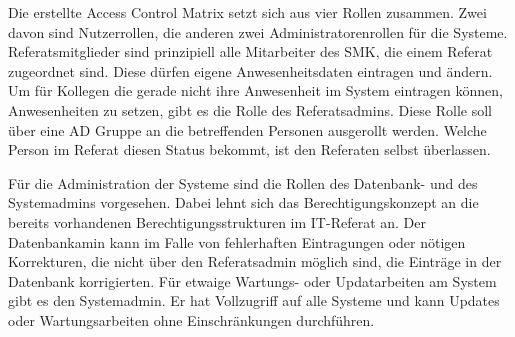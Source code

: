 Die erstellte Access Control Matrix setzt sich aus vier Rollen zusammen. Zwei davon sind Nutzerrollen, die anderen zwei Administratorenrollen für die Systeme. Referatsmitglieder sind prinzipiell alle Mitarbeiter des SMK, die einem Referat zugeordnet sind. Diese dürfen eigene Anwesenheitsdaten eintragen und \ggfs ändern. Um für Kollegen die gerade nicht ihre Anwesenheit im System eintragen können, Anwesenheiten zu setzen, gibt es die Rolle des Referatsadmins. Diese Rolle soll über eine AD Gruppe an die betreffenden Personen ausgerollt werden. Welche Person im Referat diesen Status bekommt, ist den Referaten selbst überlassen.

Für die Administration der Systeme sind die Rollen des Datenbank- und des Systemadmins vorgesehen. Dabei lehnt sich das Berechtigungskonzept an die bereits vorhandenen Berechtigungsstrukturen im IT-Referat an. Der Datenbankamin kann im Falle von fehlerhaften Eintragungen oder nötigen Korrekturen, die nicht über den Referatsadmin möglich sind, die Einträge in der Datenbank korrigierten. Für etwaige Wartungs- oder Updatarbeiten am System gibt es den Systemadmin. Er hat Vollzugriff auf alle Systeme und kann Updates oder Wartungsarbeiten ohne Einschränkungen durchführen.



